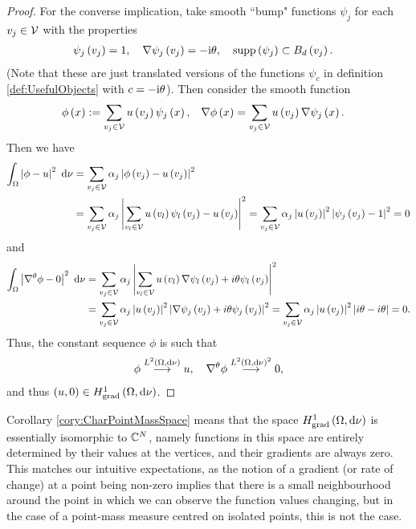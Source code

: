 \begin{proof}
	For the converse implication, take smooth ``bump" functions $\psi_j$ for each $v_j\in\mathcal{V}$ with the properties
	\begin{align*}
		\psi_j\left( v_j \right) = 1, 
		\quad \nabla\psi_j\left( v_j \right) = -\mathrm{i}\theta,
		\quad \mathrm{supp}\left( \psi_j \right) &\subset B_{d}\left( v_j \right).
	\end{align*}
	(Note that these are just translated versions of the functions $\psi_c$ in definition \ref{def:UsefulObjects} with $c=-\mathrm{i}\theta$).
	Then consider the smooth function
	\begin{align*}
		\phi\left( x \right) := \sum_{v_j\in\mathcal{V}} u\left( v_j \right)\psi_j\left( x \right),
		&\quad \nabla\phi\left( x \right) = \sum_{v_j\in\mathcal{V}} u\left( v_j \right)\nabla\psi_j\left( x \right).
	\end{align*}
	Then we have
	\begin{align*}
		\int_{\Omega}\left\lvert \phi - u \right\rvert^2 \ \mathrm{d}\nu &= \sum_{v_j\in\mathcal{V}} \alpha_j\left\lvert \phi\left( v_j \right) - u\left( v_j \right) \right\rvert^2 \\
		&= \sum_{v_j\in\mathcal{V}} \alpha_j\left\lvert  \sum_{v_l\in\mathcal{V}}u\left( v_l \right)\psi_l\left( v_j \right) - u\left( v_j \right)  \right\rvert^2
		= \sum_{v_j\in\mathcal{V}} \alpha_j\left\lvert u\left( v_j \right) \right\rvert^2\left\lvert \psi_j\left( v_j \right)-1 \right\rvert^2 = 0
	\end{align*}
	and
	\begin{align*}
		\int_{\Omega}\left\lvert \nabla^{\theta}\phi - 0 \right\rvert^2 \ \mathrm{d}\nu 
		&= \sum_{v_j\in\mathcal{V}} \alpha_j\left\lvert  \sum_{v_l\in\mathcal{V}} u\left( v_l \right)\nabla\psi_l\left( v_j \right) + i\theta\psi_l\left( v_j \right)  \right\rvert^2 \\
		&= \sum_{v_j\in\mathcal{V}} \alpha_j\left\lvert u\left( v_j \right) \right\rvert^2 \left\lvert  \nabla\psi_j\left( v_j \right) + i\theta\psi_j\left( v_j \right)  \right\rvert^2
		= \sum_{v_j\in\mathcal{V}} \alpha_j\left\lvert u\left( v_j \right) \right\rvert^2 \left\lvert  i\theta - i\theta  \right\rvert = 0.
	\end{align*}
	Thus, the constant sequence $\phi$ is such that
	\begin{align*}
		\phi \overset{L^{2}\left( \Omega,\mathrm{d}\nu \right)}{\longrightarrow} u, \quad \nabla^{\theta}\phi \overset{L^{2}\left( \Omega,\mathrm{d}\nu \right)^2}{\longrightarrow} 0,
	\end{align*}
	and thus $\left( u,0 \right)\in H^1_\mathrm{grad}\left( \Omega, \mathrm{d}\nu \right)$.
\end{proof}
Corollary \ref{cory:CharPointMassSpace} means that the space $H^1_\mathrm{grad}\left( \Omega, \mathrm{d}\nu \right)$ is essentially isomorphic to $\mathbb{C}^N$, namely functions in this space are entirely determined by their values at the vertices, and their gradients are always zero.
This matches our intuitive expectations, as the notion of a gradient (or rate of change) at a point being non-zero implies that there is a small neighbourhood around the point in which we can observe the function values changing, but in the case of a point-mass measure centred on isolated points, this is not the case.